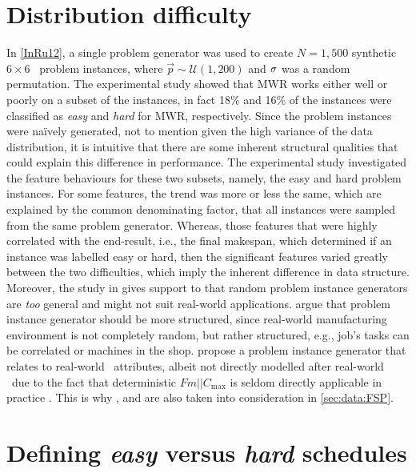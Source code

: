 \section{Distribution difficulty}
In \cref{InRu12}, a single problem generator was used to create  $N=1,500$ 
synthetic $6\times6$ \jsp\ problem instances, where 
$\vec{p}\sim\mathcal{U}(1,200)$ and ${\mathbf{\sigma}}$ was a random permutation. The 
experimental study showed that MWR works either well or poorly on a subset of 
the instances, in fact 18\% and 16\% of the instances were classified as 
\emph{easy} and \emph{hard} for MWR, respectively. 
Since the problem instances were na\"{i}vely generated, not to mention given 
the high variance of the data distribution, it is intuitive that there are some 
inherent structural qualities that could explain this difference in 
performance. The experimental study investigated the feature behaviours for 
these two subsets, namely, the easy and hard problem instances. For some 
features, the trend was more or less the same, which are explained by the 
common denominating factor, that all instances were sampled from the same 
problem generator. Whereas, those features that were highly correlated with the 
end-result, i.e., the final makespan, which determined if an instance was 
labelled easy or hard, then the significant features varied greatly between the 
two difficulties, which imply the inherent difference in data structure. 
Moreover, the study in gives support to that random problem instance generators 
are \emph{too} general and might not suit real-world applications. 
\citet{Whitley} argue that problem instance generator should be more 
structured, since real-world manufacturing environment is not completely 
random, but rather structured, e.g.,  job's tasks can be correlated or machines 
in the shop. \citeauthor{Whitley} propose a problem instance generator that 
relates to real-world \fsp\ attributes, albeit not directly modelled after 
real-world \fsp\ due to the fact that deterministic $Fm||C_{\max}$ is seldom 
directly applicable in practice \citep{Dudek92}. This is why , 
 and  are also taken into consideration in 
\cref{sec:data:FSP}.

\vfill

\section{Defining \emph{easy} versus \emph{hard} schedules} 
\label{sec:diff:easyhard}

